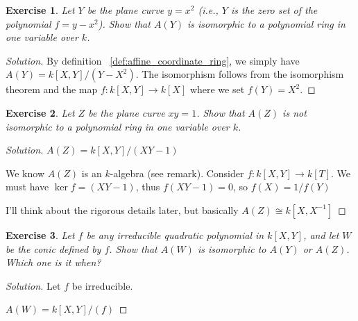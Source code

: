 \documentclass[11pt]{book}
\newtheorem{exercise}{Exercise}[section]
\newenvironment{solution}
  {\renewcommand{\qedsymbol}{}\begin{proof}[Solution]}
  {\end{proof}}
\theoremstyle{definition}
\numberwithin{equation}{section}
\begin{document}
\begin{exercise}
    Let \( Y \) be the plane curve \( y = x^2 \) (i.e., \( Y \) is the zero set of the polynomial \( f = y - x^2 \)). Show that \( A(Y) \) is isomorphic to a polynomial ring in one variable over \( k \).
\end{exercise}
\begin{solution}
    By definition ~\ref{def:affine_coordinate_ring}, we simply have \(A(Y) = k[X, Y] / (Y - X^2)\). The isomorphism follows from the isomorphism theorem and the map \(f: k[X, Y] \rightarrow k[X]\) where we set \(f(Y) = X^2\).
\end{solution}
\begin{exercise}
    Let \(Z\) be the plane curve \(xy = 1\). Show that \(A(Z)\) is not isomorphic to a polynomial ring in one variable over \(k\). 
\end{exercise}
\begin{solution}
    \(A(Z) = k[X, Y] / (XY - 1)\)

    We know \(A(Z)\) is an \(k\)-algebra (see remark). Consider \(f: k[X, Y] \longrightarrow k[T]\). We must have \(\ker{f} = (XY - 1)\), thus \(f(XY - 1) = 0\), so \(f(X) = 1 / f(Y)\)

    I'll think about the rigorous details later, but basically \(A(Z) \cong k[X, X^{-1}]\)
\end{solution}
\begin{exercise}
    Let \(f\) be any irreducible quadratic polynomial in \(k[X, Y]\), and let \(W\) be the conic defined by \(f\). Show that \(A(W)\) is isomorphic to \(A(Y)\) or \(A(Z)\). Which one is it when?
\end{exercise}
\begin{solution}
    Let \(f\) be irreducible.

    \(A(W) = k[X, Y] / (f)\)
    
\end{solution}
\printbibliography
\end{document}
